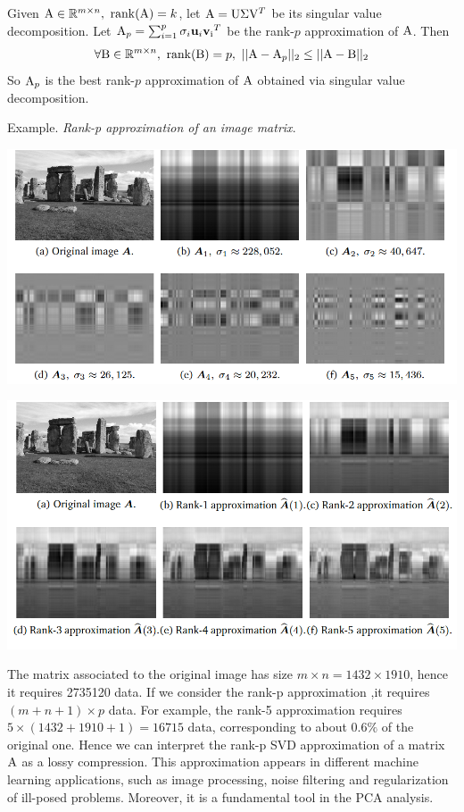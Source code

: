 \begin{theorem}
    Given $\mat{A} \in \set{R}^{m \times n},\ \rank{A} = k$, let $\mathrm{A} = \mathrm{U}\Sigma\mathrm{V}^T$ be its singular value decomposition. Let $\mathrm{A}_p = \sum^{p}_{i = 1}{\sigma_i\mathbf{u}_i\mathrm{\mathbf{v}_i}^T}$ be the rank-$p$ approximation of $\mathrm{A}$. Then
    $$ \forall \mat{B} \in \set{R}^{m \times n},\ \rank{B} = p,\ \norm{\mat{A} - \mat{A}_p}_2 \leq \norm{\mat{A} - \mat{B}}_2 $$
    So $\mathrm{A}_p$ is the best rank-$p$ approximation of $\mathrm{A}$ obtained via singular value decomposition.
\end{theorem}

Example. \textit{Rank-p approximation of an image matrix}.

\includegraphics[width=0.7 \textwidth]{sections/images/svd3.png}

\includegraphics[width=0.7 \textwidth]{sections/images/svd4.png}

The matrix associated to the original image has size $m \times n=1432 \times 1910$, hence it requires 2735120 data. If we consider the rank-p approximation ,it requires $(m+n+1)\times p$ data. For example, the rank-5 approximation requires $5\times(1432+1910+1)=16715$ data, corresponding to about $0.6 \%$ of the original one.
Hence we can interpret the rank-p SVD approximation of a matrix $\mathrm{A}$ as a lossy compression. This approximation appears in different machine learning applications, such as image processing, noise filtering and regularization of ill-posed problems. Moreover, it is a fundamental tool in the PCA analysis.

